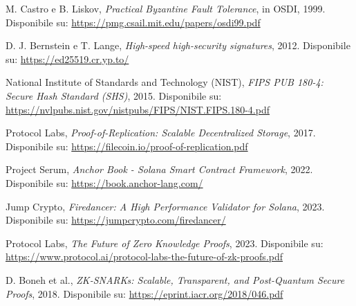 \documentclass[a4paper,12pt]{report}
\begin{document}
\begin{thebibliography}{99}
		M. Castro e B. Liskov, \emph{Practical Byzantine Fault Tolerance}, in OSDI, 1999. Disponibile su: \url{https://pmg.csail.mit.edu/papers/osdi99.pdf}
		
		D. J. Bernstein e T. Lange, \emph{High-speed high-security signatures}, 2012. Disponibile su: \url{https://ed25519.cr.yp.to/}
		
		National Institute of Standards and Technology (NIST), \emph{FIPS PUB 180-4: Secure Hash Standard (SHS)}, 2015. Disponibile su: \url{https://nvlpubs.nist.gov/nistpubs/FIPS/NIST.FIPS.180-4.pdf}
		
		Protocol Labs, \emph{Proof-of-Replication: Scalable Decentralized Storage}, 2017. Disponibile su: \url{https://filecoin.io/proof-of-replication.pdf}
		
		Project Serum, \emph{Anchor Book - Solana Smart Contract Framework}, 2022. Disponibile su: \url{https://book.anchor-lang.com/}
		
		Jump Crypto, \emph{Firedancer: A High Performance Validator for Solana}, 2023. Disponibile su: \url{https://jumpcrypto.com/firedancer/}
		
		Protocol Labs, \emph{The Future of Zero Knowledge Proofs}, 2023. Disponibile su: \url{https://www.protocol.ai/protocol-labs-the-future-of-zk-proofs.pdf}
		
		D. Boneh et al., \emph{ZK-SNARKs: Scalable, Transparent, and Post-Quantum Secure Proofs}, 2018. Disponibile su: \url{https://eprint.iacr.org/2018/046.pdf}
	\end{thebibliography}
	
\end{document}
